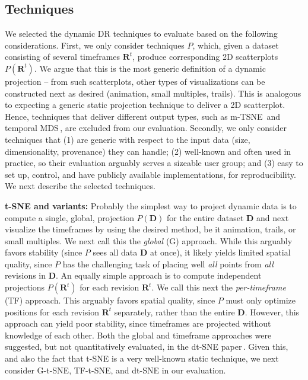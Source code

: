 \subsection{Techniques}
\label{subsec:techniques}
%
We selected the dynamic DR techniques to evaluate based on the following considerations. First, we only consider techniques $P$, which, given a dataset consisting of several timeframes $\mathbf{R}^t$, produce corresponding 2D scatterplots $P(\mathbf{R}^t)$. We argue that this is the most generic definition of a dynamic projection -- from such scatterplots, other types of visualizations can be constructed next as desired (animation, small multiples, trails). This is analogous to expecting a generic static projection technique to deliver a 2D scatterplot. Hence, techniques that deliver different output types, such as m-TSNE\,\citep{Nguyen2017} and temporal MDS\,\citep{Jackle2016}, are excluded from our evaluation. Secondly, we only consider techniques that (1) are generic with respect to the input data (size, dimensionality, provenance) they can handle; (2) well-known and often used in practice, so their evaluation arguably serves a sizeable user group; and (3) easy to set up, control, and have publicly available implementations, for reproducibility. We next describe the selected techniques.



\noindent\textbf{t-SNE and variants:} Probably the simplest way to project dynamic data is to compute a single, global, projection $P(\mathbf{D})$ for the entire dataset $\mathbf{D}$ and next visualize the timeframes by using the desired method, be it animation, trails, or small multiples. We next call this the \emph{global} (G) approach. While this arguably favors stability (since $P$ sees all data $\mathbf{D}$ at once), it likely yields limited spatial quality, since $P$ has the challenging task of placing well \emph{all} points from \emph{all} revisions in $\mathbf{D}$. An equally simple approach is to compute independent projections $P(\mathbf{R}^t)$ for each revision $\textbf{R}^t$. We call this next the \emph{per-timeframe} (TF) approach. This arguably favors spatial quality, since $P$ must only optimize positions for each revision $\mathbf{R}^t$ separately, rather than the entire $\mathbf{D}$. However, this approach can yield poor stability, since timeframes are projected without knowledge of each other. Both the global and timeframe approaches were suggested, but not quantitatively evaluated, in the dt-SNE paper\,\citep{Rauber2016}. Given this, and also the fact that t-SNE is a very well-known static technique, we next consider G-t-SNE, TF-t-SNE, and dt-SNE in our evaluation.

